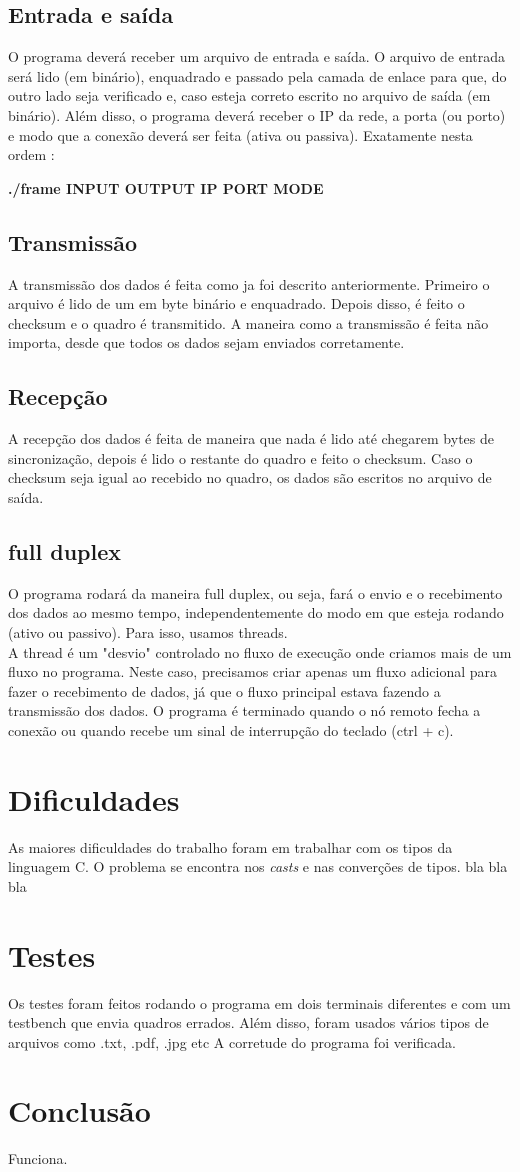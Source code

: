 \documentclass[12pt]{article}
\begin{document}
		\subsection{Entrada e saída}
			O programa deverá receber um arquivo de entrada e saída. O arquivo de entrada será lido (em binário), enquadrado e passado pela camada de enlace para que, do outro lado seja verificado e, caso esteja correto escrito no arquivo de saída (em binário).
			Além disso, o programa deverá receber o IP da rede, a porta (ou porto) e modo que a conexão deverá ser feita (ativa ou passiva). Exatamente nesta ordem :
			
			\textbf{./frame INPUT OUTPUT IP PORT MODE}
		\subsection{Transmissão}
			A transmissão dos dados é feita como ja foi descrito anteriormente. Primeiro o arquivo é lido de um em byte binário e enquadrado. Depois disso, é feito o checksum e o quadro é transmitido. A maneira como a transmissão é feita não importa, desde que todos os dados sejam enviados corretamente.
		\subsection{Recepção}
			A recepção dos dados é feita de maneira que nada é lido até chegarem bytes de sincronização, depois é lido o restante do quadro e feito o checksum. Caso o checksum seja igual ao recebido no quadro, os dados são escritos no arquivo de saída.
		\subsection{full duplex}
			O programa rodará da maneira full duplex, ou seja, fará o envio e o recebimento dos dados ao mesmo tempo, independentemente do modo em que esteja rodando (ativo ou passivo). Para isso, usamos threads. 
			\\ A thread é um "desvio" controlado no fluxo de execução onde criamos mais de um fluxo no programa. Neste caso, precisamos criar apenas um fluxo adicional para fazer o recebimento de dados, já que o fluxo principal estava fazendo a transmissão dos dados.
		O programa é terminado quando o nó remoto fecha a conexão ou quando recebe um sinal de interrupção do teclado (ctrl + c).
	\section{Dificuldades}
		As maiores dificuldades do trabalho foram em trabalhar com os tipos da linguagem C. O problema se encontra nos \textit{casts} e nas converções de tipos.
		bla bla bla
	\section{Testes}
		Os testes foram feitos rodando o programa em dois terminais diferentes e com um testbench que envia quadros errados. Além disso, foram usados vários tipos de arquivos como .txt, .pdf, .jpg etc
		A corretude do programa foi verificada.
	\section{Conclusão} 
		Funciona.
\end{document}
